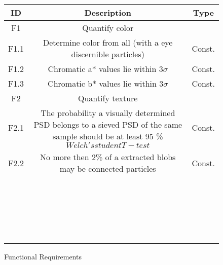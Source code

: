 \begin{figure}
	\begin{tabular}{|c|c|c|}
		\hline ID & Description & Type \\ 
		\hline F1\label{F1} & Quantify color &  \\ 
		\hline F1.1\label{F1.1} & Determine color from all (with a eye discernible particles) & Const. \\ 
		\hline F1.2\label{F1.2} & Chromatic a* values lie within $3 \sigma$ & Const. \\ 
		\hline F1.3\label{F1.3} & Chromatic b* values lie within $3 \sigma$ & Const. \\ 
		\hline F2\label{F2} & Quantify texture &  \\ 
		\hline F2.1\label{F2.1} & The probability a visually determined PSD belongs to a sieved PSD of the same sample should be at least 95 \% \(Welch's student T-test\) &  Const. \\ 
		\hline F2.2 & No more then 2\% of a extracted blobs may be connected particles & Const. \\ 
		\hline  &  &  \\ 
		\hline  &  &  \\ 
		\hline  &  &  \\ 
		\hline  &  &  \\ 
		\hline  &  &  \\ 
		\hline  &  &  \\ 
		\hline  &  &  \\ 
		\hline  &  &  \\ 
		\hline  &  &  \\ 
		\hline  &  &  \\ 
		\hline  &  &  \\ 
		\hline  &  &  \\ 
		\hline  &  &  \\ 
		\hline  &  &  \\ 
		\hline  &  &  \\ 
		\hline  &  &  \\ 
		\hline  &  &  \\ 
		\hline  &  &  \\ 
		\hline  &  &  \\ 
		\hline  &  &  \\ 
		\hline  &  &  \\ 
		\hline  &  &  \\ 
		\hline 
	\end{tabular} 
	\caption{Functional Requirements}\label{Functional Requirements}
\end{figure}